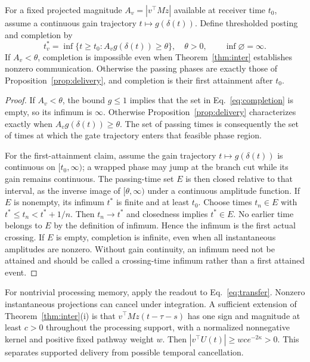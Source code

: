 \documentclass[submission,nolinenumbers]{esj}
\begin{document}
\begin{corollary}\label{cor:completion}
For a fixed projected magnitude $A_v=|v^\top Mz|$ available at receiver time $t_0$, assume a continuous gain trajectory $t\mapsto g(\delta(t))$. Define thresholded posting and completion by
\begin{equation}
t_v^*=\inf\{t\ge t_0:A_vg(\delta(t))\ge\theta\},\quad\theta>0,\qquad
\inf\varnothing=\infty.\label{eq:completion}
\end{equation}
If $A_v<\theta$, completion is impossible even when Theorem~\ref{thm:inter} establishes nonzero communication. Otherwise the passing phases are exactly those of Proposition~\ref{prop:delivery}, and completion is their first attainment after $t_0$.
\end{corollary}
\begin{proof}
If $A_v<\theta$, the bound $g\le1$ implies that the set in Eq.~\eqref{eq:completion} is empty, so its infimum is $\infty$. Otherwise Proposition~\ref{prop:delivery} characterizes exactly when $A_vg(\delta(t))\ge\theta$. The set of passing times is consequently the set of times at which the gate trajectory enters that feasible phase region.

For the first-attainment claim, assume the gain trajectory $t\mapsto g(\delta(t))$ is continuous on $[t_0,\infty)$; a wrapped phase may jump at the branch cut while its gain remains continuous. The passing-time set $E$ is then closed relative to that interval, as the inverse image of $[\theta,\infty)$ under a continuous amplitude function. If $E$ is nonempty, its infimum $t^*$ is finite and at least $t_0$. Choose times $t_n\in E$ with $t^*\le t_n<t^*+1/n$. Then $t_n\to t^*$ and closedness implies $t^*\in E$. No earlier time belongs to $E$ by the definition of infimum. Hence the infimum is the first actual crossing. If $E$ is empty, completion is infinite, even when all instantaneous amplitudes are nonzero. Without gain continuity, an infimum need not be attained and should be called a crossing-time infimum rather than a first attained event.
\end{proof}
For nontrivial processing memory, apply the readout to Eq.~\eqref{eq:transfer}. Nonzero instantaneous projections can cancel under integration. A sufficient extension of Theorem~\ref{thm:inter}(i) is that $v^\top Mz(t-\tau-s)$ has one sign and magnitude at least $c>0$ throughout the processing support, with a normalized nonnegative kernel and positive fixed pathway weight $w$. Then $|v^\top U(t)|\ge wc e^{-2\kappa}>0$. This separates supported delivery from possible temporal cancellation.
\end{document}
